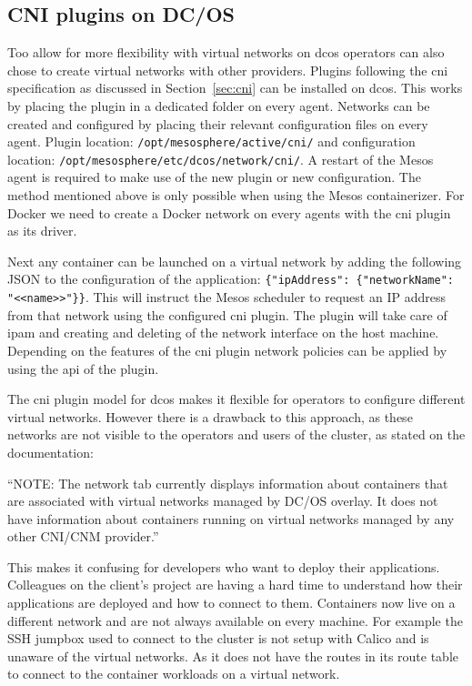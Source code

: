 \subsection{CNI plugins on DC/OS}
\label{subsec:dcos-cni}
Too allow for more flexibility with virtual networks on \gls{dcos} operators can also chose to create virtual networks with other providers. Plugins following the \gls{cni} specification as discussed in Section~\ref{sec:cni} can be installed on \gls{dcos}. This works by placing the plugin in a dedicated folder on every agent. Networks can be created and configured by placing their relevant configuration files on every agent. Plugin location: \texttt{/opt/mesosphere/active/cni/} and configuration location: \texttt{/opt/mesosphere/etc/dcos/network/cni/}. A restart of the Mesos agent is required to make use of the new plugin or new configuration.  The method mentioned above is only possible when using the Mesos containerizer. For Docker we need to create a Docker network on every agents with the \gls{cni} plugin as its driver.

Next any container can be launched on a virtual network by adding the following JSON to the configuration of the application: \texttt{\{"ipAddress": \{"networkName": "<<name>>"\}\}}. This will instruct the Mesos scheduler to request an IP address from that network using the configured \gls{cni} plugin. The plugin will take care of \gls{ipam} and creating and deleting of the network interface on the host machine. Depending on the features of the \gls{cni} plugin network policies can be applied by using the \gls{api} of the plugin.

The \gls{cni} plugin model for \gls{dcos} makes it flexible for operators to configure different virtual networks. However there is a drawback to this approach, as these networks are not visible to the operators and users of the cluster, as stated on the documentation\cite{dcos_sdn}:
\begin{displayquote}
    ``NOTE: The network tab currently displays information about containers that are associated with virtual networks managed by DC/OS overlay. It does not have information about containers running on virtual networks managed by any other CNI/CNM provider.'' 
\end{displayquote}
This makes it confusing for developers who want to deploy their applications. Colleagues on the client's project are having a hard time to understand how their applications are deployed and how to connect to them. Containers now live on a different network and are not always available on every machine. For example the SSH jumpbox used to connect to the cluster is not setup with Calico and is unaware of the virtual networks. As it does not have the routes in its route table to connect to the container workloads on a virtual network. 

